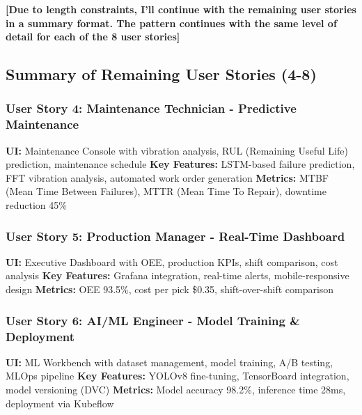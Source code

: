 \documentclass[
]{article}
\begin{document}
\textbf{{[}Due to length constraints, I'll continue with the remaining
user stories in a summary format. The pattern continues with the same
level of detail for each of the 8 user stories{]}}

\hypertarget{summary-of-remaining-user-stories-4-8}{%
\subsection{Summary of Remaining User Stories
(4-8)}\label{summary-of-remaining-user-stories-4-8}}

\hypertarget{user-story-4-maintenance-technician---predictive-maintenance}{%
\subsubsection{User Story 4: Maintenance Technician - Predictive
Maintenance}\label{user-story-4-maintenance-technician---predictive-maintenance}}

\textbf{UI:} Maintenance Console with vibration analysis, RUL (Remaining
Useful Life) prediction, maintenance schedule \textbf{Key Features:}
LSTM-based failure prediction, FFT vibration analysis, automated work
order generation \textbf{Metrics:} MTBF (Mean Time Between Failures),
MTTR (Mean Time To Repair), downtime reduction 45\%

\hypertarget{user-story-5-production-manager---real-time-dashboard}{%
\subsubsection{User Story 5: Production Manager - Real-Time
Dashboard}\label{user-story-5-production-manager---real-time-dashboard}}

\textbf{UI:} Executive Dashboard with OEE, production KPIs, shift
comparison, cost analysis \textbf{Key Features:} Grafana integration,
real-time alerts, mobile-responsive design \textbf{Metrics:} OEE 93.5\%,
cost per pick \$0.35, shift-over-shift comparison

\hypertarget{user-story-6-aiml-engineer---model-training-deployment}{%
\subsubsection{User Story 6: AI/ML Engineer - Model Training \&
Deployment}\label{user-story-6-aiml-engineer---model-training-deployment}}

\textbf{UI:} ML Workbench with dataset management, model training, A/B
testing, MLOps pipeline \textbf{Key Features:} YOLOv8 fine-tuning,
TensorBoard integration, model versioning (DVC) \textbf{Metrics:} Model
accuracy 98.2\%, inference time 28ms, deployment via Kubeflow
\end{document}
